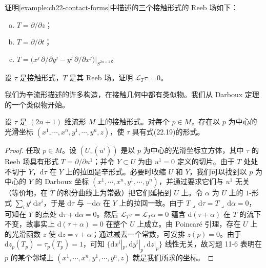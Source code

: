 \documentclass[../../main.tex]{subfiles}
\begin{document}
\begin{exercise}\label{exercise:ch22-29}
证明\cref{example:ch22-contact-forms}中描述的三个接触形式的 Reeb 场如下：
\begin{enumerate}[(a)]
\item $T=\partial/\partial z$；
\item $T=\partial/\partial t$；
\item $T=\big(x^j\,\partial/\partial y^j-y^j\,\partial/\partial x^j\big)|_{S^{2n+1}}$。
\end{enumerate}
\end{exercise}

\begin{exercise}\label{exercise:ch22-30}
设 $\tau$ 是接触形式，$T$ 是其 Reeb 场。证明 $\mathcal L_T\tau=0$。
\end{exercise}

我们为辛流形描述的许多构造，在接触几何中都有类似物。我们从 Darboux 定理的一个类似物开始。

\begin{theorem}[接触 Darboux 定理]\label{theorem:ch22-contact-darboux}
设 $\tau$ 是 $(2n+1)$ 维流形 $M$ 上的接触形式。对每个 $p\in M$，存在以 $p$ 为中心的光滑坐标 $(x^1,\cdots ,x^n,y^1,\cdots ,y^n,z)$，使 $\tau$ 具有式(22.19)的形式。
\end{theorem}

\begin{proof}
任取 $p\in M$。设 $(U,(u^i))$ 是以 $p$ 为中心的光滑坐标立方体，其中 $\tau$ 的 Reeb 场具有形式 $T=\partial/\partial u^1$；并令 $Y\subset U$ 为由 $u^1=0$ 定义的切片。由于 $T$ 处处不切于 $Y$，$\mathrm{d}\tau$ 在 $Y$ 上的拉回是辛形式。必要时收缩 $U$ 和 $Y$，我们可以找到以 $p$ 为中心的 $Y$ 的 Darboux 坐标 $(x^1,\cdots ,x^n,y^1,\cdots ,y^n)$，并通过要求它们与 $u^1$ 无关（等价地，在 $T$ 的积分曲线上为常数）把它们延拓到 $U$ 上。令 $\alpha$ 为 $U$ 上的 $1$-形式 $\sum_i y^i\,\mathrm{d}x^i$，于是 $\mathrm{d}\tau$ 与 $-\mathrm{d}\alpha$ 在 $Y$ 上的拉回一致。由于 $T\lrcorner\,\mathrm{d}\tau=T\lrcorner\,\mathrm{d}\alpha=0$，可知在 $Y$ 的点处 $\mathrm{d}\tau+\mathrm{d}\alpha=0$。然后 $\mathcal L_T\tau=\mathcal L_T\alpha=0$ 蕴含 $\mathrm{d}(\tau+\alpha)$ 在 $T$ 的流下不变，故事实上 $\mathrm{d}(\tau+\alpha)=0$ 在整个 $U$ 上成立。由 Poincar\'e 引理，存在 $U$ 上的光滑函数 $z$ 使 $\mathrm{d}z=\tau+\alpha$；通过减去一个常数，可安排 $z(p)=0$。由于 $\mathrm{d}z_p(T_p)=\tau_p(T_p)=1$，可知 $\{\mathrm{d}x^i|_p,\mathrm{d}y^i|_p,\mathrm{d}z|_p\}$ 线性无关，故习题 11-6 表明在 $p$ 的某个邻域上 $(x^1,\cdots ,x^n,y^1,\cdots ,y^n,z)$ 就是我们所求的坐标。
\end{proof}
\end{document}
